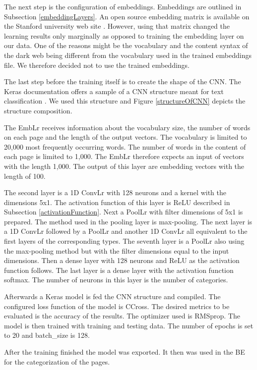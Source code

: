 The next step is the configuration of embeddings. Embeddings are outlined in Subsection \ref{embeddingLayers}. An open source embedding matrix is available on the Stanford university web site \cite{embeddings}. However, using that matrix changed the learning results only marginally as opposed to training the embedding layer on our data. One of the reasons might be the vocabulary and the content syntax of the dark web being different from the vocabulary used in the trained embeddings file. We therefore decided not to use the trained embeddings.

The last step before the training itself is to create the shape of the CNN. The Keras documentation offers a sample of a CNN structure meant for text classification \cite{kerasCNNStructure}. We used this structure and Figure \ref{structureOfCNN} depicts the structure composition. 

The EmbLr receives information about the vocabulary size, the number of words on each page and the length of the output vectors. The vocabulary is limited to 20,000 most frequently occurring words. The number of words in the content of each page is limited to 1,000. The EmbLr therefore expects an input of vectors with the length 1,000. The output of this layer are embedding vectors with the length of 100. 

The second layer is a 1D ConvLr with 128 neurons and a kernel with the dimensions 5x1. The activation function of this layer is ReLU described in Subsection \ref{activationFunction}. Next a PoolLr with filter dimensions of 5x1 is prepared. The method used in the pooling layer is max-pooling. The next layer is a 1D ConvLr followed by a PoolLr and another 1D ConvLr all equivalent to the first layers of the corresponding types. The seventh layer is a PoolLr also using the max-pooling method but with the filter dimensions equal to the input dimensions. Then a dense layer with 128 neurons and ReLU as the activation function follows. The last layer is a dense layer with the activation function softmax. The number of neurons in this layer is the number of categories.

Afterwards a Keras model is fed the CNN structure and compiled. The configured loss function of the model is CCross. The desired metrics to be evaluated is the accuracy of the results. The optimizer used  is RMSprop. The model is then trained with training and testing data. The number of epochs is set to 20 and batch\_size is 128.

After the training finished the model was exported. It then was used in the BE for the categorization of the pages.

